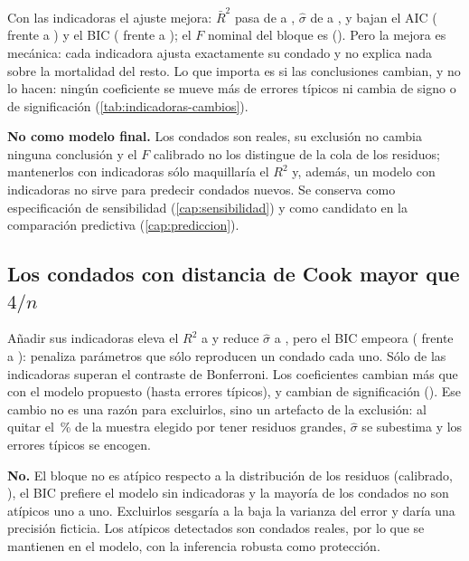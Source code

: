 

Con las indicadoras el ajuste mejora: $\bar R^2$ pasa de  a ,
$\hat\sigma$ de  a , y bajan el AIC ( frente a
) y el BIC ( frente a ); el $F$ nominal del bloque es
 (). Pero la mejora es mecánica: cada indicadora ajusta exactamente su
condado y no explica nada sobre la mortalidad del resto. Lo que importa es si las conclusiones
cambian, y no lo hacen: ningún coeficiente se mueve más de  errores típicos ni cambia de signo o
de significación (\cref{tab:indicadoras-cambios}).

\begin{idea}
\textbf{No como modelo final.} Los condados son reales, su exclusión no cambia ninguna conclusión y
el $F$ calibrado no los distingue de la cola de los residuos; mantenerlos con indicadoras sólo
maquillaría el $R^2$ y, además, un modelo con indicadoras no sirve para predecir condados nuevos.
Se conserva como especificación de sensibilidad (\cref{cap:sensibilidad}) y como candidato en la
comparación predictiva (\cref{cap:prediccion}).
\end{idea}

\subsection{Los condados con distancia de Cook mayor que \texorpdfstring{$4/n$}{4/n}}

Añadir sus  indicadoras eleva el $R^2$ a  y reduce $\hat\sigma$ a
, pero el BIC empeora ( frente a ): penaliza
 parámetros que sólo reproducen un condado cada uno. Sólo  de las
 indicadoras superan el contraste de Bonferroni. Los coeficientes cambian más que
con el modelo propuesto (hasta  errores típicos), y 
cambian de significación (). Ese cambio no es una razón para excluirlos, sino
un artefacto de la exclusión: al quitar el \,\% de la muestra elegido por tener residuos
grandes, $\hat\sigma$ se subestima y los errores típicos se encogen.



\begin{idea}
\textbf{No.} El bloque no es atípico respecto a la distribución de los residuos (calibrado,
), el BIC prefiere el modelo sin indicadoras y la mayoría de los condados no son
atípicos uno a uno. Excluirlos sesgaría a la baja la varianza del error y daría una precisión
ficticia. Los atípicos detectados son condados reales, por lo que se mantienen en el modelo, con
la inferencia robusta como protección.
\end{idea}
